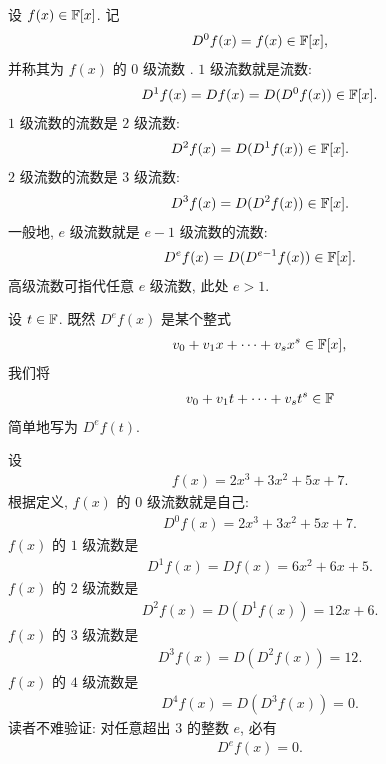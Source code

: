 \begin{definition}
    设 $f(x) \in \mathbb{F}[x]$. 记
    \begin{align*}
        D^0 f(x) = f(x) \in \mathbb{F}[x],
    \end{align*}
    并称其为 $f(x)$ 的 $0$ 级流数 . $1$ 级流数就是流数:
    \begin{align*}
        D^1 f(x) = D f(x) = D (D^0 f(x)) \in \mathbb{F}[x].
    \end{align*}
    $1$ 级流数的流数是 $2$ 级流数:
    \begin{align*}
        D^2 f(x) = D (D^1 f(x)) \in \mathbb{F}[x].
    \end{align*}
    $2$ 级流数的流数是 $3$ 级流数:
    \begin{align*}
        D^3 f(x) = D (D^2 f(x)) \in \mathbb{F}[x].
    \end{align*}
    一般地, $e$ 级流数就是 $e - 1$ 级流数的流数:
    \begin{align*}
        D^e f(x) = D (D^{e-1} f(x)) \in \mathbb{F}[x].
    \end{align*}
    高级流数可指代任意 $e$ 级流数, 此处 $e > 1$.

    设 $t \in \mathbb{F}$. 既然 $D^e f(x)$ 是某个整式
    \begin{align*}
        v_0 + v_1 x + \cdots + v_s x^s \in \mathbb{F}[x],
    \end{align*}
    我们将
    \begin{align*}
        v_0 + v_1 t + \cdots + v_s t^s \in \mathbb{F}
    \end{align*}
    简单地写为 $D^e f(t)$.
\end{definition}

\begin{example}
    设
    \begin{align*}
        f(x) = 2x^3 + 3x^2 + 5x + 7.
    \end{align*}
    根据定义, $f(x)$ 的 $0$ 级流数就是自己:
    \begin{align*}
        D^0 f(x) = 2x^3 + 3x^2 + 5x + 7.
    \end{align*}
    $f(x)$ 的 $1$ 级流数是
    \begin{align*}
        D^1 f(x) = Df(x) = 6x^2 + 6x + 5.
    \end{align*}
    $f(x)$ 的 $2$ 级流数是
    \begin{align*}
        D^2 f(x) = D(D^1 f(x)) = 12x + 6.
    \end{align*}
    $f(x)$ 的 $3$ 级流数是
    \begin{align*}
        D^3 f(x) = D(D^2 f(x)) = 12.
    \end{align*}
    $f(x)$ 的 $4$ 级流数是
    \begin{align*}
        D^4 f(x) = D(D^3 f(x)) = 0.
    \end{align*}
    读者不难验证: 对任意超出 $3$ 的整数 $e$, 必有
    \begin{align*}
        D^e f(x) = 0.
    \end{align*}
\end{example}

